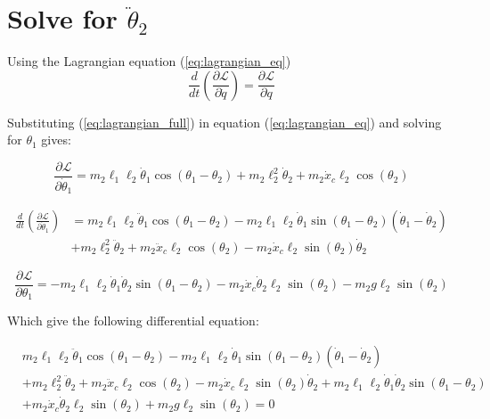 \documentclass[10pt]{article}
\begin{document}
    
    \pagebreak
    \section{Solve for $\ddot \theta_2$}

    Using the Lagrangian equation (\ref{eq:lagrangian_eq})
    \begin{equation} \label{eq:lagrangian_eq}
        \frac{d}{dt} \left(\frac{\partial \mathcal{L}}{\partial \dot q} \right) = 
        \frac{\partial \mathcal{L}}{\partial q}
    \end{equation}

    Substituting (\ref{eq:lagrangian_full}) in equation (\ref{eq:lagrangian_eq}) and solving for $\theta_1$ gives:

    \begin{equation} \label{eq: lagrange Step1}
        \frac{\partial \mathcal{L}}{\partial \dot\theta_1} = 
        m_2 \ell_1 \ell_2 \dot \theta_1 \cos(\theta_1 - \theta_2)
        + m_2\ell_2^2 \dot\theta_2 
        + m_2 \dot x_c \ell_2 \cos(\theta_2)
    \end{equation}

    \begin{equation} \label{eq: lagrange Step2}
        \begin{aligned}
        \frac{d}{dt} \left(\frac{\partial \mathcal{L}}{\partial \dot\theta_1}\right) &= 
        m_2 \ell_1 \ell_2 \ddot \theta_1 \cos(\theta_1 - \theta_2) - m_2 \ell_1 \ell_2 \dot \theta_1 \sin(\theta_1 - \theta_2)(\dot \theta_1 - \dot \theta_2)\\
        &+m_2\ell_2^2 \ddot \theta_2 + m_2 \ddot x_c \ell_2 \cos(\theta_2) - m_2 \dot x_c \ell_2 \sin(\theta_2)\dot\theta_2
        \end{aligned}
    \end{equation}

    
    \begin{equation} \label{eq: lagrange Step3}
        \frac{\partial \mathcal{L}}{\partial\theta_1} =
        -m_2 \ell_1 \ell_2 \dot \theta_1 \dot\theta_2\sin(\theta_1-\theta_2)
        -m_2\dot x_c \dot \theta_2 \ell_2 \sin(\theta_2)
        -m_2g\ell_2\sin(\theta_2)
        \end{equation}

    Which give the following differential equation:

    \begin{equation}
        \begin{aligned}
                &m_2 \ell_1 \ell_2 \ddot \theta_1 \cos(\theta_1 - \theta_2) - m_2 \ell_1 \ell_2 \dot \theta_1 \sin(\theta_1 - \theta_2)(\dot \theta_1 - \dot \theta_2)\\
                &+m_2\ell_2^2 \ddot \theta_2 + m_2 \ddot x_c \ell_2 \cos(\theta_2) - m_2 \dot x_c \ell_2 \sin(\theta_2)\dot\theta_2 + m_2 \ell_1 \ell_2 \dot \theta_1 \dot\theta_2\sin(\theta_1 - \theta_2)\\
                &+m_2\dot x_c \dot \theta_2 \ell_2 \sin(\theta_2)+m_2g\ell_2\sin(\theta_2) = 0
        \end{aligned}
    \end{equation}   
\end{document}
